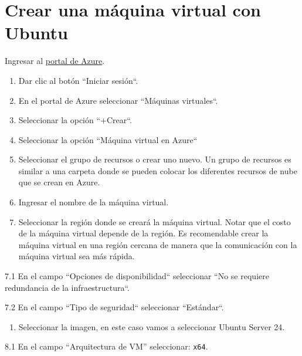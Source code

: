 \documentclass[11pt,a4paper,oneside]{book}
\begin{document}
\section{Crear una máquina virtual con Ubuntu}

Ingresar al \href{https://azure.microsoft.com/es-mx/features/azure-portal/}{portal de Azure}.

\begin{enumerate}

\item Dar clic al botón ``Iniciar sesión``.

\item En el portal de Azure seleccionar ``Máquinas virtuales``.

\item Seleccionar la opción ``+Crear``.

\item Seleccionar la opción ``Máquina virtual en Azure``

\item Seleccionar el grupo de recursos o crear uno nuevo. Un grupo de recursos es similar a una carpeta donde se pueden colocar los diferentes recursos de nube que se crean en Azure.

\item Ingresar el nombre de la máquina virtual.

\item Seleccionar la región donde se creará la máquina virtual. Notar que el costo de la máquina virtual depende de la región. Es recomendable crear la máquina virtual en una región cercana de manera que la comunicación con la máquina virtual sea más rápida.

\end{enumerate}

7.1 En el campo ``Opciones de disponibilidad`` seleccionar ``No se requiere redundancia de la infraestructura``.

7.2 En el campo ``Tipo de seguridad`` seleccionar ``Estándar``.

\begin{enumerate}

\item Seleccionar la imagen, en este caso vamos a seleccionar Ubuntu Server 24.

\end{enumerate}

8.1 En el campo ``Arquitectura de VM'' seleccionar: \texttt{x64}.
\end{document}
